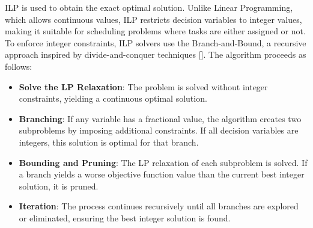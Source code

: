 \documentclass[12pt]{article}
\begin{document}
ILP is used to obtain the exact optimal solution. Unlike Linear Programming, which allows continuous values, ILP restricts decision variables to integer values, making it suitable for scheduling problems where tasks are either assigned or not. To enforce integer constraints, ILP solvers use the Branch-and-Bound, a recursive approach inspired by divide-and-conquer techniques []. The algorithm proceeds as follows:

\begin{itemize}
    \item \textbf{Solve the LP Relaxation}: The problem is solved without integer constraints, yielding a continuous optimal solution.
    \item \textbf{Branching}: If any variable has a fractional value, the algorithm creates two subproblems by imposing additional constraints. If all decision variables are integers, this solution is optimal for that branch.
    \item \textbf{Bounding and Pruning}: The LP relaxation of each subproblem is solved. If a branch yields a worse objective function value than the current best integer solution, it is pruned.
    \item \textbf{Iteration}: The process continues recursively until all branches are explored or eliminated, ensuring the best integer solution is found.
\end{itemize}




\end{document}

